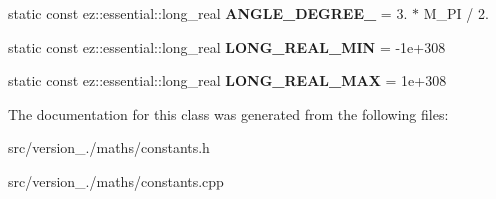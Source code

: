 \begin{DoxyCompactItemize}
static const ez\+::essential\+::long\+\_\+real {\bfseries A\+N\+G\+L\+E\+\_\+\+D\+E\+G\+R\+E\+E\+\_} = 3. $\ast$ M\+\_\+\+PI / 2.
\item 
\mbox{\label{classez_1_1maths_1_1Constants_a76d618b3578ec0e288bea566620a4919}} 
static const ez\+::essential\+::long\+\_\+real {\bfseries L\+O\+N\+G\+\_\+\+R\+E\+A\+L\+\_\+\+M\+IN} = -\/1e+308
\item 
\mbox{\label{classez_1_1maths_1_1Constants_ad75d9366f88c7e5f70b1d0721790e1fd}} 
static const ez\+::essential\+::long\+\_\+real {\bfseries L\+O\+N\+G\+\_\+\+R\+E\+A\+L\+\_\+\+M\+AX} = 1e+308
\end{DoxyCompactItemize}


The documentation for this class was generated from the following files\+:\begin{DoxyCompactItemize}
\item 
src/version\+\_./maths/constants.\+h\item 
src/version\+\_./maths/constants.\+cpp\end{DoxyCompactItemize}
